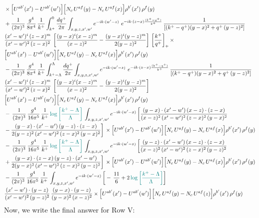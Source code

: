 \documentclass[9pt]{article}
\numberwithin{equation}{section}
\begin{document}
\begin{align}
&\times\Big[U^{ab'}(x')-U^{ab'}(w')\Big]\Big[N_{c}\,U^{af}(y)-N_{c}\,U^{af}(x)\Big]\rho^{b'}(x')\,\rho^{f}(y)\notag \\ & + \frac{1}{(2\pi)^{3}}\,\frac{g^{4}}{8\pi^{4}}\,\frac{1}{k^{+}}\int_{k^{+}}^{0}\frac{dq^{+}}{2\pi}\int_{x,y,z,x',w'}e^{-ik\cdot(w'-z)}\ e^{-ik\cdot(z-x)\frac{(k^{+}-q^{+})}{k^{+}}}\,\frac{1}{\left[(k^{+}-q^{+})(y-x)^{2}+q^{+}\,(y-z)^{2}\right]}\notag \\ & \frac{(x'-w')^{i}\,(z-x)^{m}}{(x'-w')^{2}\,(z-x)^{2}}\,\left[\frac{(y-x)^{i}(x-z)^{m}}{(x-z)^{2}}-\frac{(y-x)^{i}(y-z)^{m}}{2(y-z)^{2}}\right]\,\left[\frac{k^{+}}{q^{+}}\right]_{+}\times\notag \\ & \Big[U^{ab'}(x')-U^{ab'}(w')\Big]\Big[N_{c}\,U^{af}(y)-N_{c}\,U^{af}(x)\Big]\rho^{b'}(x')\,\rho^{f}(y)\notag \\ & - \frac{1}{(2\pi)^{3}}\,\frac{g^{4}}{8\pi^{4}}\,\frac{1}{k^{+}}\int_{k^{+}-\Lambda}^{\Lambda}\frac{dq^{+}}{2\pi}\int_{x,y,z,x',w'}e^{-ik\cdot(w'-z)}\ e^{-ik\cdot(z-x)\frac{(k^{+}-q^{+})}{k^{+}}}\,\frac{1}{\left[(k^{+}-q^{+})(y-x)^{2}+q^{+}\,(y-z)^{2}\right]}\notag \\ & \frac{(x'-w')^{i}\,(z-x)^{m}}{(x'-w')^{2}\,(z-x)^{2}}\,\left[\frac{(y-x)^{i}(x-z)^{m}}{(x-z)^{2}}-\frac{(y-x)^{i}(y-z)^{m}}{2(y-z)^{2}}\right]\notag \\ & \Big[U^{ab'}(x')-U^{ab'}(w')\Big]\Big[N_{c}\,U^{af}(y)-N_{c}\,U^{af}(x)\Big]\rho^{b'}(x')\,\rho^{f}(y)\notag \\ & -\, \frac{1}{(2\pi)^{3}}\,\frac{g^{4}}{16\pi^{5}}\,\frac{1}{k^{+}}\,{\color{teal}\log{\left[\frac{k^{+}-\Lambda}{\Lambda}\right]}}\,\int_{x,y,z,x',w'}e^{-ik\cdot(w'-x)}\, \bigg[\frac{(y-x)\cdot (x'-w')\,(x-z)\cdot (z-x)}{(x-z)^{2}\,(x'-w')^{2}\,(z-x)^{2}\,(y-x)^{2}}\notag \\ & -\frac{(y-x)\cdot (x'-w')\,(y-z)\cdot (z-x)}{2(y-z)^{2}\,(x'-w')^{2}\,(z-x)^{2}\,(y-x)^{2}}\bigg]\,\times \Big[U^{ab'}(x')-U^{ab'}(w')\Big]\Big[N_{c}\,U^{af}(y)-N_{c}\,U^{af}(x)\Big]\rho^{b'}(x')\,\rho^{f}(y)\notag \\ & -\, \frac{1}{(2\pi)^{3}}\,\frac{g^{4}}{16\pi^{5}}\,\frac{1}{k^{+}}\,{\color{teal}\log{\left[\frac{k^{+}-\Lambda}{\Lambda}\right]}}\,\int_{x,y,z,x',w'}e^{-ik\cdot(w'-z)}\,\bigg[\frac{(y-z)\cdot (x'-w')\,(x-z)\cdot (z-x)}{(x-z)^{2}\,(x'-w')^{2}\,(z-x)^{2}\,(y-z)^{2}}\notag \\ & +\frac{(y-x)\cdot (z-x)\,(y-z)\cdot (x'-w')}{2(y-x)^{2}\,(x'-w')^{2}\,(z-x)^{2}\,(y-z)^{2}}\bigg]\,\times \Big[U^{ab'}(x')-U^{ab'}(w')\Big]\Big[N_{c}\,U^{af}(y)-N_{c}\,U^{af}(x)\Big]\rho^{b'}(x')\,\rho^{f}(y)\notag \\ & - \frac{1}{(2\pi)^{3}}\,\frac{g^{4}}{16\pi^{5}}\,\frac{1}{k^{+}}\,\int_{x,y,z,x',w'}e^{-ik\cdot(w'-z)}\,\bigg[-\,\frac{11}{6}+2\,{\color{teal}\log{\left[\frac{k^{+}-\Lambda}{\Lambda}\right]}}\bigg]\notag \\ & \frac{(x'-w')\cdot(y-z)}{(x'-w')^{2}\,(y-z)^{2}}\,\frac{(y-x)\cdot(y-z)}{(y-x)^{2}\,(x-z)^{2}}\times\Big[U^{ab'}(x')-U^{ab'}(w')\Big]\Big[N_{c}\,U^{af}(y)-N_{c}\,U^{af}(z)\Big]\rho^{b'}(x')\,\rho^{f}(y)
\end{align}
Now, we write the final answer for Row V:
\end{document}
